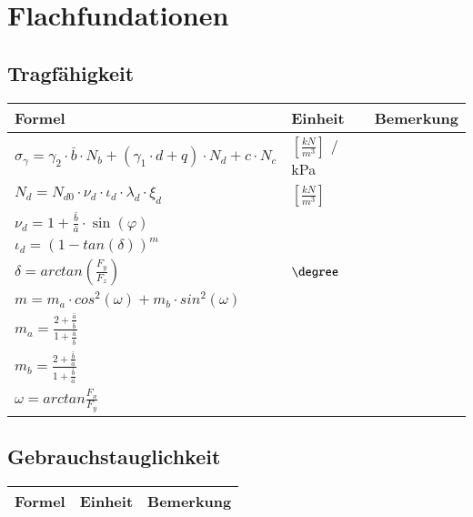 \section{Flachfundationen}
	\begin{minipage}{\linewidth}
	\subsection{Tragfähigkeit}
		\begin{tabular}{|l|l|l}
			Formel			&	Einheit		&	Bemerkung \\ \hline
			
			$ \sigma_{\gamma}
			=
			\gamma_2 \cdot \bar{b} \cdot N_b + ( \gamma_1 \cdot d + q ) \cdot N_d + c \cdot N_c $	& $ \left[\frac{kN}{m^3}\right] $ / kPa	&	\\
			$ N_d
			=
			N_{d0} \cdot \nu_d \cdot \iota_d \cdot \lambda_d \cdot \xi_d $
							& $ \left[\frac{kN}{m^3}\right] $		&	\\
			$ \nu_d
			=
			1 + \frac{\bar{b}}{\bar{a}} \cdot \sin(\varphi) $ &			&	\\
			$ \iota_d
			=
			( 1 - tan(\delta))^m $	&		&	\\
			$ \delta
			=
			arctan \left( \frac{F_y}{F_z}\right) $		 & $\degree$		&	\\
			$ m
			=
			m_a \cdot cos^2 (\omega) + m_b \cdot sin^2 (\omega) $ & &	\\
			$ m_a
			=
			\frac{2 + \frac{\bar{a}}{\bar{b}}}{1 + \frac{\bar{a}}{\bar{b}}} $ & & \\
			$ m_b
			=
			\frac{2 + \frac{\bar{b}}{\bar{a}}}{1 + \frac{\bar{b}}{\bar{a}}} $ & & \\	
			$ \omega
			=
			arctan \frac{F_x}{F_y} $ &		&			\\ \hline
		\end{tabular}
	
	
	\end{minipage}






	\begin{minipage}{\linewidth}
		\subsection{Gebrauchstauglichkeit}
	
	

	\end{minipage}



\begin{minipage}{\linewidth}
	\begin{tabular}{l|l|l}
		Formel			&	Einheit	&	Bemerkung \\ \hline
	\end{tabular}
\end{minipage}